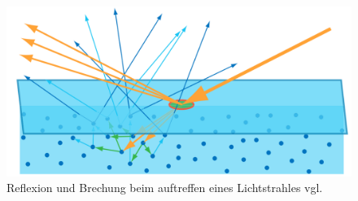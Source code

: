 \documentclass[
  11pt,
  a4paper,
  oneside
  ]{article}
\begin{document}
\begin{figure}[H]
  \centering
  \includegraphics*[width=0.9 \textwidth]{images/scattering.png}
  \caption{Reflexion und Brechung beim auftreffen eines Lichtstrahles vgl. \cite{learnOpenGL}}
  \label{fig:img10}
\end{figure}
\end{document}
